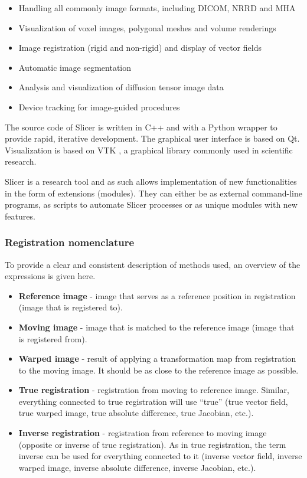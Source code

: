 \documentclass[type=dr, dr=rernat, accentcolor=tud7b,colorbacktitle, bigchapter, openright, twoside, 12pt ]{tudthesis}
\begin{document}
\begin{itemize}
	\item Handling all commonly image formats, including DICOM, NRRD and MHA
	\item Visualization of voxel images, polygonal meshes and volume renderings
	\item Image registration (rigid and non-rigid) and display of vector fields
	\item Automatic image segmentation
	\item Analysis and visualization of diffusion tensor image data
	\item Device tracking for image-guided procedures
\end{itemize}

The source code of Slicer is written in C++ and with a Python wrapper to provide rapid, iterative development. The graphical user interface is based on Qt. Visualization is based on VTK \cite{Vtk}, a graphical library commonly
used in scientific research.

Slicer is a research tool and as such allows implementation of new functionalities in the form of extensions (modules). They can either be as external command-line programs, 
as scripts to automate Slicer processes or as unique modules with new features. 

\subsubsection{Registration nomenclature}

To provide a clear and consistent description of methods used, an overview of the expressions is given here.

\begin{itemize}
 \item \textbf{Reference image} - image that serves as a reference position in registration (image that is registered to).
 \item \textbf{Moving image} - image that is matched to the reference image (image that is registered from).
 \item \textbf{Warped image} - result of applying a transformation map from registration to the moving image. It should be as close to the reference image as possible.
 \item \textbf{True registration} - registration from moving to reference image. Similar, everything connected to true registration will use ``true'' (true vector field, true warped image, true absolute difference, true Jacobian, etc.).
 \item \textbf{Inverse registration} - registration from reference to moving image (opposite or inverse of true registration). As in true registration, the term inverse can be used for everything connected to it (inverse vector field, inverse warped image, inverse absolute difference, inverse Jacobian, etc.).
\end{itemize}
\end{document}
